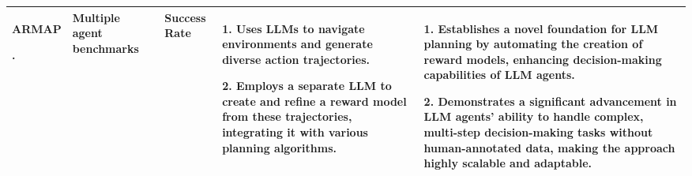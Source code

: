 \begin{table*}[!h]
{\begin{tabular}{|p{2.8cm}|p{2.2cm}|p{3.0cm}|p{5.5cm}|p{6.0cm}|}
 \hline
ARMAP \par \cite{chenautonomous2025}.& Multiple agent benchmarks & Success Rate &1. Uses LLMs to navigate environments and generate diverse action trajectories. \par 2. Employs a separate LLM to create and refine a reward model from these trajectories, integrating it with various planning algorithms. & 1. Establishes a novel foundation for LLM planning by automating the creation of reward models, enhancing decision-making capabilities of LLM agents. \par 2. Demonstrates a significant advancement in LLM agents' ability to handle complex, multi-step decision-making tasks without human-annotated data, making the approach highly scalable and adaptable.\\
\hline

\end{tabular}
}
\label{tab:foundation_3}
\end{table*}



